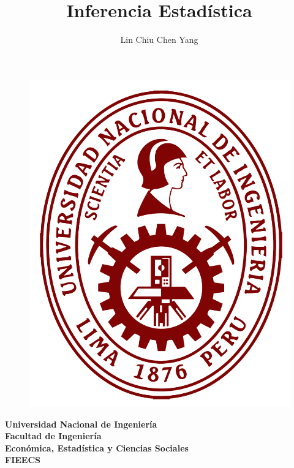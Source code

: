 \documentclass[12pt]{article}
\title{\textcolor{Micolor1}{Inferencia Estadística}}
\author{\textcolor{Micolor2}{Lin Chiu Chen Yang }\\
}
\begin{document}
\begin{figure}
    \centering
    \includegraphics[scale=0.15]{Escudo_UNI.png}
    
    \label{fig:my_label}
\end{figure}

\maketitle

\vfill
\begin{flushright}
\Large{\textbf{Universidad Nacional de Ingeniería}}\\
\Large{\textbf{\textcolor{gris}{\normalsize Facultad de Ingeniería}}}\\
\Large{\textbf{\textcolor{gris}{\normalsize Económica, Estadística y Ciencias Sociales}}}\\
\Large{\textbf{\textcolor{gris}{\normalsize FIEECS}}}\\
\Large{\textbf{\deptname}}\\
\end{flushright}


\newpage





%
\end{document}
